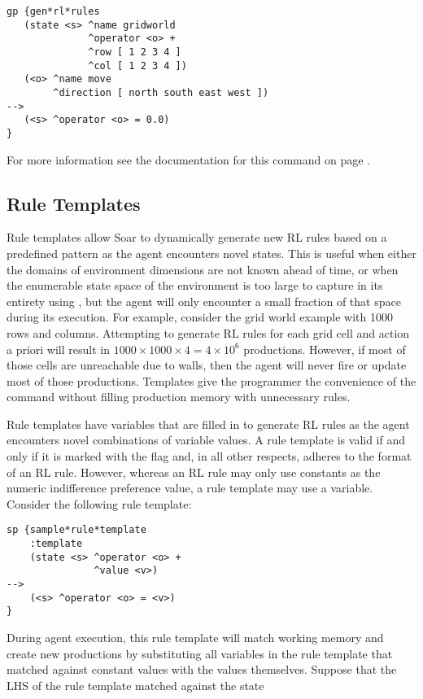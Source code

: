 \begin{verbatim}
gp {gen*rl*rules
   (state <s> ^name gridworld
              ^operator <o> +
              ^row [ 1 2 3 4 ]
              ^col [ 1 2 3 4 ])
   (<o> ^name move
        ^direction [ north south east west ])
-->
   (<s> ^operator <o> = 0.0)
}
\end{verbatim}
	
For more information see the documentation for this command on page \pageref{gp}.

\subsection{Rule Templates}
\label{RL-templates}

Rule templates allow Soar to dynamically generate new RL rules based on a predefined pattern as the agent encounters novel states.
This is useful when either the domains of environment dimensions are not known ahead of time, or when the enumerable state space of the environment is too large to capture in its entirety using , but the agent will only encounter a small fraction of that space during its execution.
For example, consider the grid world example with 1000 rows and columns.
Attempting to generate RL rules for each grid cell and action a priori will result in $1000 \times 1000 \times 4 = 4 \times 10^6$ productions.
However, if most of those cells are unreachable due to walls, then the agent will never fire or update most of those productions.
Templates give the programmer the convenience of the  command without filling production memory with unnecessary rules.

Rule templates have variables that are filled in to generate RL rules as the agent encounters novel combinations of variable values.
A rule template is valid if and only if it is marked with the  flag and, in all other respects, adheres to the format of an RL rule.
However, whereas an RL rule may only use constants as the numeric indifference preference value, a rule template may use a variable.
Consider the following rule template:

\begin{verbatim}
sp {sample*rule*template
    :template
    (state <s> ^operator <o> +
               ^value <v>)
-->
    (<s> ^operator <o> = <v>)
}
\end{verbatim}

During agent execution, this rule template will match working memory and create new productions by substituting all variables in the rule template that matched against constant values with the values themselves.
Suppose that the LHS of the rule template matched against the state

